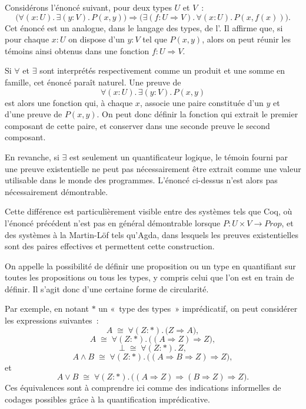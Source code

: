 \thingy
Considérons l'énoncé suivant, pour deux types $U$ et $V$ :
\[
\bigl(\forall(x:U).\,\exists(y:V).\,P(x,y)\bigr)
\Rightarrow
\bigl(\exists(f:U\Rightarrow V).\,\forall(x:U).\,P(x,f(x))\bigr).
\]
Cet énoncé est un analogue, dans le langage des types, de l'.  Il affirme que, si pour chaque $x:U$ on dispose d'un $y:V$
tel que $P(x,y)$, alors on peut réunir les témoins ainsi obtenus dans une
fonction $f:U\Rightarrow V$.

\thingy
Si $\forall$ et $\exists$ sont interprétés respectivement comme un
produit et une somme en famille, cet énoncé paraît naturel.  Une preuve
de
\[
\forall(x:U).\,\exists(y:V).\,P(x,y)
\]
est alors une fonction qui, à chaque $x$, associe une paire constituée
d'un $y$ et d'une preuve de $P(x,y)$.  On peut donc définir la fonction
qui extrait le premier composant de cette paire, et conserver dans une
seconde preuve le second composant.

En revanche, si $\exists$ est seulement un quantificateur logique, le
témoin fourni par une preuve existentielle ne peut pas nécessairement
être extrait comme une valeur utilisable dans le monde des programmes.
L'énoncé ci-dessus n'est alors pas nécessairement démontrable.

\thingy
Cette différence est particulièrement visible entre des systèmes tels
que Coq, où l'énoncé précédent n'est pas en général démontrable lorsque
$P:U\times V\to\mathit{Prop}$, et des systèmes à la Martin-Löf tels
qu'Agda, dans lesquels les preuves existentielles sont des paires
effectives et permettent cette construction.


\thingy
On appelle  la possibilité de définir une
proposition ou un type en quantifiant sur toutes les propositions ou
tous les types, y compris celui que l'on est en train de définir.  Il
s'agit donc d'une certaine forme de circularité.

Par exemple, en notant $*$ un « type des types » imprédicatif, on peut
considérer les expressions suivantes :
\[
A \;\cong\; \forall(Z:*).\,\bigl(Z\Rightarrow A\bigr),
\]
\[
A \;\cong\;
\forall(Z:*).\,\bigl((A\Rightarrow Z)\Rightarrow Z\bigr),
\]
\[
\bot\;\cong\;\forall(Z:*).\,Z,
\]
\[
A\land B\;\cong\;
\forall(Z:*).\,\bigl((A\Rightarrow B\Rightarrow Z)\Rightarrow Z\bigr),
\]
et
\[
A\lor B\;\cong\;
\forall(Z:*).\,\bigl((A\Rightarrow Z)\Rightarrow
(B\Rightarrow Z)\Rightarrow Z\bigr).
\]
Ces équivalences sont à comprendre ici comme des indications
informelles de codages possibles grâce à la quantification
imprédicative.

